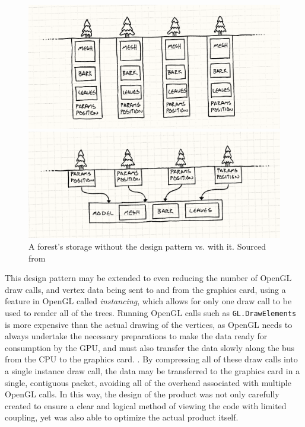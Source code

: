 \documentclass[10pt, openany]{book}
\begin{document}
\begin{figure}[H]
\centering
\begin{minipage}{.46\textwidth}
  \centering
  \includegraphics[width=.98\linewidth]{flyweight-trees}
\end{minipage}%
\begin{minipage}{.54\textwidth}
  \centering
  \includegraphics[width=.98\linewidth]{flyweight-tree-model}
\end{minipage}
\caption[Flyweight Forest]{A forest's storage without the \textit{} design pattern vs. with it. Sourced from \citep{nystrom2014game}}
\label{fig:flyweight}
\end{figure}	

This design pattern may be extended to even reducing the number of \Gls{OpenGL} draw calls, and vertex data being sent to and from the graphics card, using a feature in \Gls{OpenGL} called \textit{instancing}, which allows for only one draw call to be used to render all of the trees. Running \Gls{OpenGL} calls such as \texttt{GL.DrawElements} is more expensive than the actual drawing of the vertices, as \Gls{OpenGL} needs to always undertake the necessary preparations to make the data ready for consumption by the GPU, and must also transfer the data slowly along the bus from the CPU to the graphics card. \citep{learnOpenGLInstancing}. By compressing all of these draw calls into a single instance draw call, the data may be transferred to the graphics card in a single, contiguous packet, avoiding all of the overhead associated with multiple \Gls{OpenGL} calls. In this way, the design of the product was not only carefully created to ensure a clear and logical method of viewing the code with limited coupling, yet was also able to optimize the actual product itself.
\end{document}
